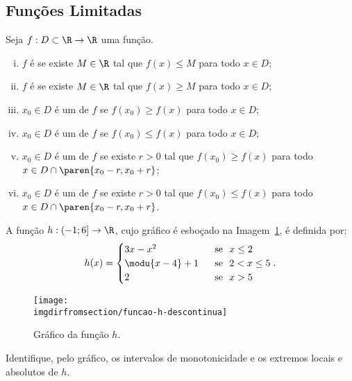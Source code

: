 \subsection{Funções Limitadas}

\begin{definition}
    Seja $f: D \subset \R \to \R$ uma função.
\begin{enumerate}[(i)]
  \item $f$ é  se existe $M \in \R$ tal
  que $f(x) \leq M$ para todo $x \in D$;
  \item $f$ é  se existe $M \in \R$ tal
  que $f(x) \geq M$ para todo $x \in D$;
  \item $x_0 \in D$ é um  de $f$ se
  $f(x_0) \geq f(x)$ para todo $x \in D$;
  \item $x_0 \in D$ é um  de $f$ se
  $f(x_0) \leq f(x)$ para todo $x \in D$;
  \item $x_0 \in D$ é um  de $f$ se
  existe $r>0$ tal que $f(x_0) \geq f(x)$ para todo $x \in D \cap \paren{x_0 - r , x_0+r}$;
  \item $x_0 \in D$ é um  de $f$ se
  existe $r>0$ tal que $f(x_0) \leq f(x)$ para todo $x \in D \cap \paren{x_0 - r ,
  x_0+r}$.
\end{enumerate}
\end{definition}

\begin{example}
    A função $h : \left( -1 ; 6 \right] \to \R$, cujo gráfico é esboçado
na Imagem~\ref{img:funcao-h-descontinua}, é definida por:
%
$$h(x) = \begin{cases}
                                3x-x^2 & \ \text{ se } \ x\leq 2 \\
                                \modu{x-4} +1 & \ \text{ se } \ 2 < x \leq 5 \\
                                2 & \ \text{ se } \ x > 5 \\
                                \end{cases}.$$
%
\begin{figure}
\centering
\texttt{[image: \\imgdirfromsection/funcao-h-descontinua]}
\caption{Gráfico da função $h$.}
\label{img:funcao-h-descontinua}
\end{figure}
%
Identifique, pelo gráfico, os intervalos de monotonicidade e os extremos locais e absolutos de $h$.
\end{example}

